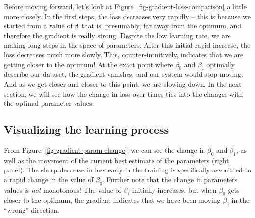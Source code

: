 \documentclass[
  letterpaper,
]{scrbook}
\begin{document}
Before moving forward, let's look at
Figure~\ref{fig-gradient-loss-comparison} a little more closely. In the
first steps, the loss decreases very rapidly -- this is because we
started from a value of \(\mathbf{\beta}\) that is, presumably, far away
from the optimum, and therefore the gradient is really strong. Despite
the low learning rate, we are making long steps in the space of
parameters. After this initial rapid increase, the loss decreases much
more slowly. This, counter-intuitively, indicates that we are getting
closer to the optimum! At the exact point where \(\beta_0\) and
\(\beta_1\) optimally describe our dataset, the gradient vanishes, and
our system would stop moving. And as we get closer and closer to this
point, we are slowing down. In the next section, we will see how the
change in loss over times ties into the changes with the optimal
parameter values.

\subsection{Visualizing the learning
process}\label{visualizing-the-learning-process}

From Figure~\ref{fig-gradient-param-change}, we can see the change in
\(\beta_0\) and \(\beta_1\), as well as the movement of the current best
estimate of the parameters (right panel). The sharp decrease in loss
early in the training is specifically associated to a rapid change in
the value of \(\beta_0\). Further note that the change in parameters
values is \emph{not} monotonous! The value of \(\beta_1\) initially
increases, but when \(\beta_0\) gets closer to the optimum, the gradient
indicates that we have been moving \(\beta_1\) in the ``wrong''
direction.
\end{document}
